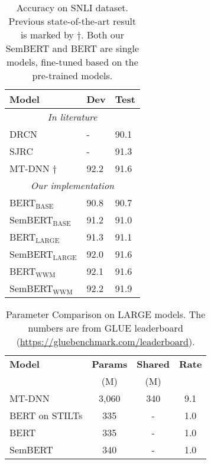 \documentclass[letterpaper]{article} \usepackage{aaai20}  \usepackage{times}  \usepackage{helvet} \usepackage{courier}  \usepackage[hyphens]{url}  \usepackage{graphicx} \urlstyle{rm} \def\UrlFont{\rm}  \usepackage{graphicx}  \frenchspacing  \usepackage{amssymb}
\begin{document}
\begin{table}
		\resizebox{\linewidth}{!}
	{
	\begin{tabular}{p{5cm} p{1cm} p{1cm}}
		\hline
		
		\hline
		\textbf{Model} &  \textbf{Dev} & \textbf{Test}   \\ 
		\hline
		\multicolumn{3}{c}{\emph{In literature}} \\
		DRCN \cite{kim2018semantic} &- & 90.1\\
		SJRC \cite{zhang2019explicit} & - & 91.3 \\
		MT-DNN \cite{liu2019multi}$\dagger$ &92.2 & 91.6\\
		\hline
		\multicolumn{3}{c}{\emph{Our implementation}} \\
		BERT$_\text{BASE}$ & 90.8 & 90.7\\
		SemBERT$_\text{BASE}$ & 91.2 & 91.0 \\
		\hdashline
		BERT$_\text{LARGE}$  & 91.3  & 91.1  \\
		SemBERT$_\text{LARGE}$ & 92.0  & 91.6 \\
		\hdashline
		BERT$_\text{WWM}$ & 92.1 & 91.6 \\
		SemBERT$_\text{WWM}$ & 92.2 & 91.9 \\ 
		\hline
		
		\hline
	\end{tabular}
}
	{
		\caption{\label{tab:snli} Accuracy on SNLI dataset. Previous state-of-the-art result is marked by $\dagger$. Both our SemBERT and BERT are single models, fine-tuned based on the pre-trained models.} } 
	
\end{table}

\begin{table} 
	\centering
			\begin{tabular}{l c c c}
				\hline
				
				\hline
				\textbf{Model} &  \textbf{Params} & \textbf{Shared }  &\textbf{Rate}   \\ 
				&  (M)  &  (M) & \\
				\hline
				MT-DNN & 3,060  & 340 & 9.1\\
				BERT on STILTs & 335 & - & 1.0\\
				BERT & 335 & - &  1.0\\
				SemBERT & 340 & - & 1.0\\
				\hline
				
				\hline
			\end{tabular}
		{
			\caption{\label{tab:glue_com} Parameter Comparison on LARGE models. The numbers are from GLUE leaderboard (\url{https://gluebenchmark.com/leaderboard}).}
		}
 \end{table}
 
\end{document}
